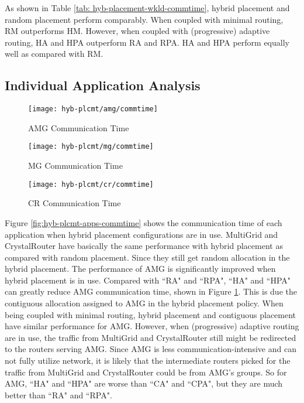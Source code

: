As shown in Table \ref{tab: hyb-placement-wkld-commtime}, hybrid placement and random placement perform comparably. When coupled with minimal routing, RM outperforms HM. However, when coupled with (progressive) adaptive routing, HA and HPA outperform RA and RPA. HA and HPA perform equally well as compared with RM.  


\subsection{Individual Application Analysis}

\begin{figure*}[t!]
    \centering
    \begin{subfigure}[t]{0.32\textwidth}
        \centering
        \texttt{[image: hyb-plcmt/amg/commtime]}
        \caption{AMG Communication Time}
        \label{fig:hyb-plcmt-amg-commtime}
    \end{subfigure}\hfill
    \hspace{1em}%
    \begin{subfigure}[t]{0.32\textwidth}
        \centering
        \texttt{[image: hyb-plcmt/mg/commtime]}
        \caption{MG Communication Time}
        \label{fig:hyb-plcmt-mg-commtime}
    \end{subfigure}\hfill
    \begin{subfigure}[t]{0.32\textwidth}
        \centering
        \texttt{[image: hyb-plcmt/cr/commtime]}
        \caption{CR Communication Time}
        \label{fig:hyb-plcmt-cr-commtime}
    \end{subfigure}%
   \caption{Application communication time. Workload  is running under all the possible placement and routing configurations.}
   \label{fig:hyb-plcmt-apps-commtime}
\end{figure*}

Figure \ref{fig:hyb-plcmt-apps-commtime} shows the communication time of each application when hybrid placement configurations are in use. MultiGrid and CrystalRouter have basically the same performance with hybrid placement as compared with random placement. Since they still get random allocation in the hybrid placement. The performance of AMG is significantly improved when hybrid placement is in use. Compared with ``RA" and ``RPA", ``HA" and ``HPA" can greatly reduce AMG communication time, shown in Figure \ref{fig:hyb-plcmt-amg-commtime}. This is due the contiguous allocation assigned to AMG in the hybrid placement policy. When being coupled with minimal routing, hybrid placement and contiguous placement have similar performance for AMG. However, when (progressive) adaptive routing are in use, the traffic from MultiGrid and CrystalRouter still might be redirected to the routers serving AMG. Since AMG is less communication-intensive and can not fully utilize network, it is likely that the intermediate routers picked for the traffic from MultiGrid and CrystalRouter could be from AMG's groups. So for AMG, ``HA" and ``HPA" are worse than ``CA" and ``CPA", but they are much better than ``RA" and ``RPA".

